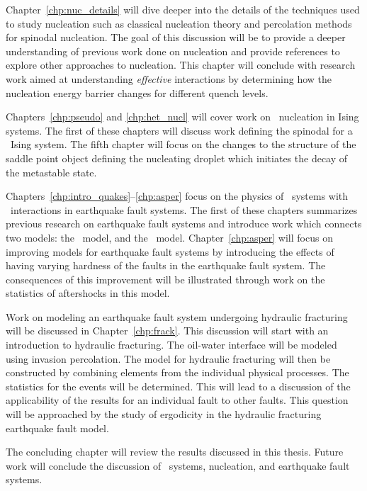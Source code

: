 Chapter~\ref{chp:nuc_details} will dive deeper into the details of the techniques used to study nucleation such as classical nucleation theory and percolation methods for spinodal nucleation. The goal of this discussion will be to provide a deeper understanding of previous work done on nucleation and provide references to explore other approaches to  nucleation. This chapter will conclude with research work aimed at understanding \textit{effective} interactions by determining how the nucleation energy barrier changes for different quench levels.

Chapters~\ref{chp:pseudo} and \ref{chp:het_nucl} will cover work on \het\ nucleation in Ising systems. The first of these chapters will discuss work defining the spinodal for a \het\ Ising system. The fifth chapter will focus on the changes to the structure of the saddle point object defining the nucleating droplet which initiates the decay of the metastable state.

Chapters~\ref{chp:intro_quakes}--\ref{chp:asper} focus on the physics of \het\ systems with \lr\ interactions in earthquake fault systems. The first of these chapters  summarizes previous research on earthquake fault systems and introduce work which connects two models: the \ofc\ model, and the \rjb\ model. Chapter~\ref{chp:asper} will focus on improving models for earthquake fault systems by introducing the effects of having varying hardness of the faults in the earthquake fault system. The consequences of this improvement will be illustrated through work on the statistics of aftershocks in this model.

Work on modeling an earthquake fault system undergoing hydraulic fracturing will be discussed in Chapter~\ref{chp:frack}. This discussion will start with an introduction  to hydraulic fracturing.  The oil-water interface will be modeled using invasion percolation. The model for hydraulic fracturing will then be constructed by combining elements from the individual physical processes. The statistics for the events  will be determined. This will lead to a discussion of the applicability of the results for an individual fault to other faults. This question will be approached by the study of ergodicity in the hydraulic fracturing earthquake fault model.
 
The concluding chapter will review the results discussed in this thesis. Future work will conclude the discussion of \het\ systems, nucleation, and earthquake fault systems.

